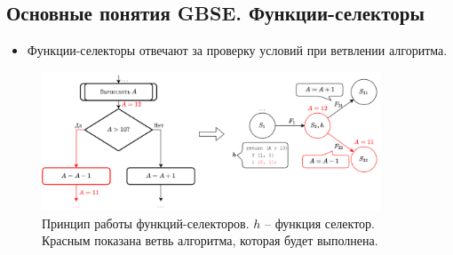 \subsection{Основные понятия GBSE. Функции-селекторы}

\begin{frame}
	\begin{itemize}
		\item Функции-селекторы отвечают за проверку условий при ветвлении алгоритма.
	\end{itemize}

	\begin{figure}
		\centering
		\includegraphics[width=0.9\textwidth]{images/illustration.selector.png}
		\caption{Принцип работы функций-селекторов. $h$ -- функция селектор. Красным показана ветвь алгоритма, которая будет выполнена.}
	\end{figure}
\end{frame}

